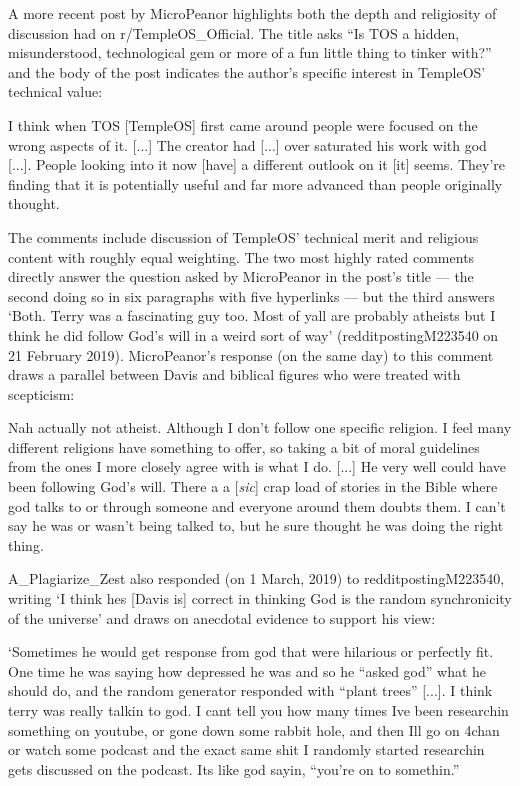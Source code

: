 \documentclass[Draft.tex]{subfiles}
\begin{document}
A more recent post by MicroPeanor \parencite*{MicroPeanor19} highlights
both the depth and religiosity of discussion had on r/TempleOS\_Official.
The title asks
``Is TOS a hidden, misunderstood, technological gem
or more of a fun little thing to tinker with?''
and the body of the post indicates the author's specific interest in
TempleOS' technical value:
\begin{displayquote}
	I think when TOS [TempleOS] first came around people were focused
	on the wrong aspects of it.  [...]
	The creator had [...] over saturated his work with god [...].
  People looking into it now [have] a different outlook on it [it] seems.
	They’re finding that it is potentially useful and far more advanced
	than people originally thought.
\end{displayquote}
The comments include discussion of TempleOS' technical merit and religious
content with roughly equal weighting.
The two most highly rated comments directly answer the question asked by
MicroPeanor in the post's title --- the second doing so in six paragraphs
with five hyperlinks --- but the third answers
`Both. Terry was a fascinating guy too.
Most of yall are probably atheists but I think
he did follow God's will in a weird sort of way'
(redditpostingM223540 on 21 February 2019).
MicroPeanor's response (on the same day) to this comment
draws a parallel between
Davis and biblical figures who were treated with scepticism:
\begin{displayquote}
	Nah actually not atheist. Although I don’t follow one specific religion.
	I feel many different religions have something to offer,
	so taking a bit of moral guidelines from the ones I more closely agree with
	is what I do.  [...]
	He very well could have been following God’s will.
	There a a [\textit{sic}] crap load of stories in the Bible
	where god talks to or through someone and everyone around them doubts them.
	I can’t say he was or wasn’t being talked to,
	but he sure thought he was doing the right thing.
\end{displayquote}
A\_Plagiarize\_Zest also responded (on 1 March, 2019) to redditpostingM223540,
writing `I think hes [Davis is] correct in thinking God
is the random synchronicity of the universe' and draws on anecdotal evidence
to support his view:
\begin{displayquote}
	`Sometimes he would get response from god that were hilarious or perfectly fit.
	One time he was saying how depressed he was and so he ``asked god''
	what he should do, and the random generator responded
	with ``plant trees'' [...].
	I think terry was really talkin to god. I cant tell you how many times
	Ive been researchin something on youtube, or gone down some rabbit hole,
	and then Ill go on 4chan or watch some podcast and the exact same shit
	I randomly started researchin gets discussed on the podcast.
	Its like god sayin, ``you're on to somethin.''
\end{displayquote}
\end{document}
